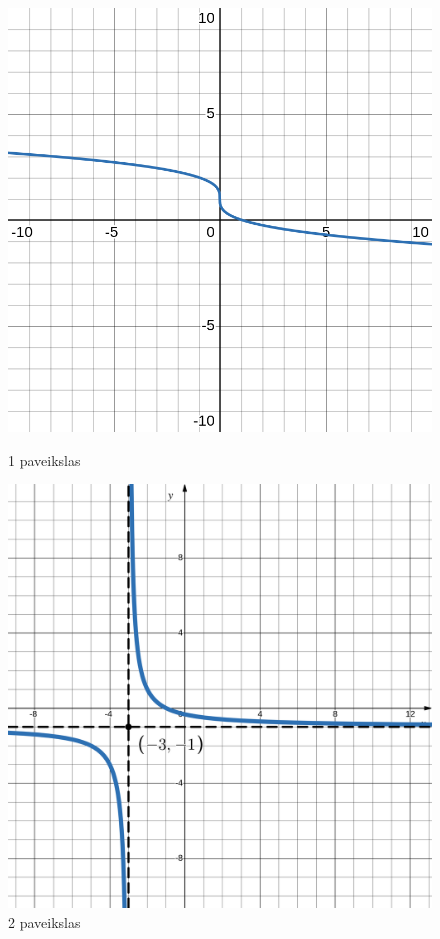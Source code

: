 \documentclass[a4paper]{article}
\begin{document}
\begin{enumerate}
\begin{figure}[!htpb]
                  \begin{minipage}[]{0.5\linewidth}
                        \centering
                        \includegraphics[width=.85\linewidth]{images/func_1.png}
                        \captionsetup{labelformat=empty}
                        \caption{1 paveikslas}
                        \label{fig:test1}
                  \end{minipage}%
                  \begin{minipage}{.5\textwidth}
                        \centering

                        \includegraphics[width=.85\linewidth]{images/func_2.png}
                        \captionsetup{labelformat=empty}
                        \caption{2 paveikslas}
                        \label{fig:test2}
                  \end{minipage}
            \end{figure}
\end{enumerate}
\end{document}
